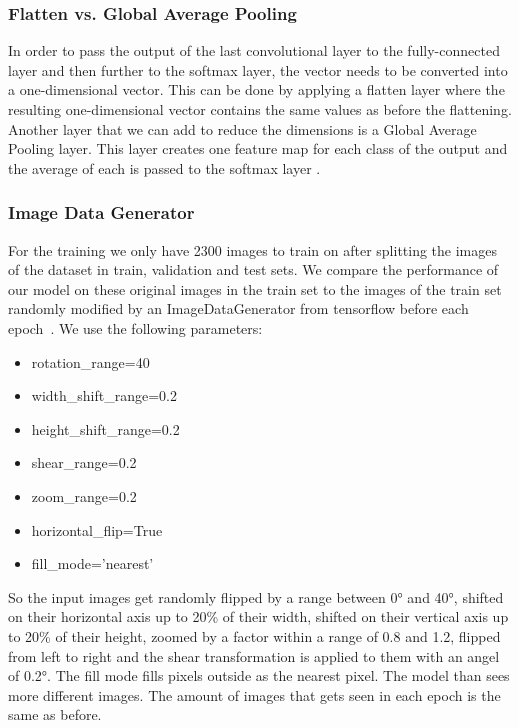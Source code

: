\documentclass[sn-mathphys,Numbered]{sn-jnl}%
\theoremstyle{thmstyleone}%
\theoremstyle{thmstyletwo}%
\theoremstyle{thmstylethree}%
\begin{document}
\subsubsection{Flatten vs. Global Average Pooling}\label{fullyConnected}
In order to pass the output of the last convolutional layer to the fully-connected layer and then further to the softmax layer, the vector needs to be converted into a one-dimensional vector. This can be done by applying a flatten layer where the resulting one-dimensional vector contains the same values as before the flattening.\\
Another layer that we can add to reduce the dimensions is a Global Average Pooling layer. This layer creates one feature map for each class of the output and the average of each is passed to the softmax layer \cite{Admin_2023}.
\subsubsection{Image Data Generator}\label{ImageDataGenerator}
For the training we only have 2300 images to train on after splitting the images of the dataset in train, validation and test sets. We compare the performance of our model on these original images in the train set to the images of the train set randomly modified by an ImageDataGenerator from tensorflow before each epoch~\cite{IDG}. We use the following parameters:\\
\begin{itemize}
\item rotation\_range=40
\item width\_shift\_range=0.2
\item height\_shift\_range=0.2
\item shear\_range=0.2
\item zoom\_range=0.2
\item horizontal\_flip=True
\item fill\_mode='nearest'
\end{itemize}
So the input images get randomly flipped by a range between 0° and 40°, shifted on their horizontal axis up to 20\% of their width, shifted on their vertical axis up to 20\% of their height, zoomed by a factor within a range of 0.8 and 1.2, flipped from left to right and the shear transformation is applied to them with an angel of 0.2°. The fill mode fills pixels outside as the nearest pixel. The model than sees more different images. The amount of images that gets seen in each epoch is the same as before.\\
\end{document}
